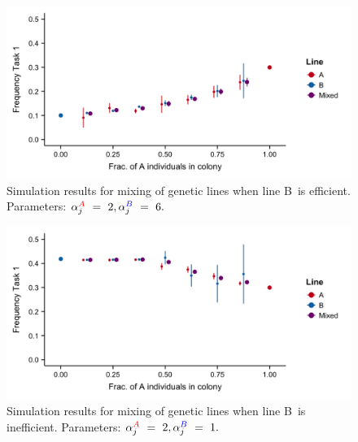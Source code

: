 \documentclass[11pt]{article}
\newcommand{\A}{{\color{red}A}}
\newcommand{\B}{{\color{blue}B}}
\begin{document}

\begin{figure}[H]
    \centering
    \includegraphics[trim={0 0.25in 0 0.2in}, clip, width=0.9\linewidth]{doc/Mix_Alphas_B-super-efficient_Means.png}
    \caption{Simulation results for mixing of genetic lines when line \B\ is efficient. Parameters: $\alpha_j^{\A}~=~2, \alpha_j^{\B}~=~6.$}
    \label{fig:Mix_Alphas_B-efficient}
\end{figure}

\begin{figure}[H]
    \centering
    \includegraphics[trim={0 0.25in 0 0.2in}, clip, width=0.9\linewidth]{doc/Mix_Alphas_B-inefficient_Means.png}
    \caption{Simulation results for mixing of genetic lines when line \B\ is inefficient. Parameters: $\alpha_j^{\A}~=~2, \alpha_j^{\B}~=~1.$}
    \label{fig:Mix_Alphas_B-inefficient}
\end{figure}
\end{document}
